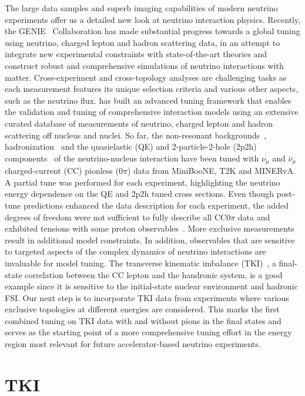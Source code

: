 The large data samples and superb imaging capabilities of modern neutrino experiments offer us a detailed new look at neutrino interaction physics.
Recently, the GENIE~\cite{Andreopoulos:2009rq, GENIE:2021npt} Collaboration has made substantial progress towards a global tuning using neutrino, charged lepton and hadron scattering data, in an attempt to integrate new experimental constraints with state-of-the-art theories and construct robust and comprehensive simulations of neutrino interactions with matter. 
Cross-experiment and cross-topology analyses are challenging tasks as each measurement features its unique selection criteria and various other  aspects, such as the neutrino flux. \genie has built an advanced tuning framework that enables the validation and tuning of comprehensive interaction models using an extensive curated database of measurements of neutrino, charged lepton and hadron scattering off nucleus and nuclei. So far, the non-resonant backgrounds~\cite{GENIE:2021zuu}, hadronization~\cite{GENIE:2021wox} and the quasielastic (QE) and 2-particle-2-hole (2p2h)  components~\cite{GENIE:2022qrc} of the neutrino-nucleus interaction have been tuned with $\nu_\mu$ and $\bar{\nu}_\mu$ charged-current (CC) pionless (0$\pi$) data from MiniBooNE, T2K and MINERvA. A partial tune was performed for each experiment, highlighting the neutrino energy dependence on the QE and 2p2h tuned cross sections. Even though post-tune predictions enhanced the data description for each experiment, the added degrees of freedom were not sufficient to fully describe all CC0$\pi$ data and exhibited tensions with some proton observables~\cite{GENIE:2022qrc}. More exclusive measurements result in additional model constraints. In addition, observables that are sensitive to targeted aspects of the complex dynamics of neutrino interactions are invaluable for model tuning. The transverse kinematic imbalance (TKI)~\cite{Lu:2015hea, Lu:2015tcr}, a final-state correlation between the CC lepton and the handronic system, is a good example since it is sensitive to the initial-state nuclear environment and hadronic FSI. Our next step is to incorporate TKI data from experiments where various exclusive topologies at different energies are considered. This marks the first combined tuning on TKI data with and without pions in the final states and serves as the starting point of a more comprehensive tuning effort in the energy region most relevant for future accelerator-based neutrino experiments.  


\section{TKI}
\label{sec:nuint-tki}

